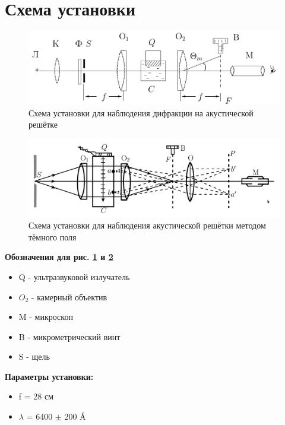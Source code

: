 \documentclass{article}
\begin{document}
\section{Схема установки}
\begin{figure}[h!]
  \includegraphics[width=\linewidth]{pic1.png}
  \caption{Схема установки для наблюдения дифракции на акустической решётке}
  \label{fig:pic1}
\end{figure}
\begin{figure}[h!]
  \includegraphics[width=\linewidth]{pic2.png}
  \caption{Схема установки для наблюдения акустической решётки методом тёмного поля}
  \label{fig:pic2}
\end{figure}
\textbf{Обозначения для рис. \ref{fig:pic1} и \ref{fig:pic2}}
\begin{itemize}
	\item Q - ультразвуковой излучатель
	\item $O_2$ - камерный объектив
	\item M - микроскоп
	\item B  - микрометрический винт
	\item S  - щель
\end{itemize}
\textbf{Параметры установки:}
\begin{itemize}
	\item f = 28 см
	\item $\lambda$ = 6400 $\pm$ 200 {\AA}
\end{itemize}
\end{document}
